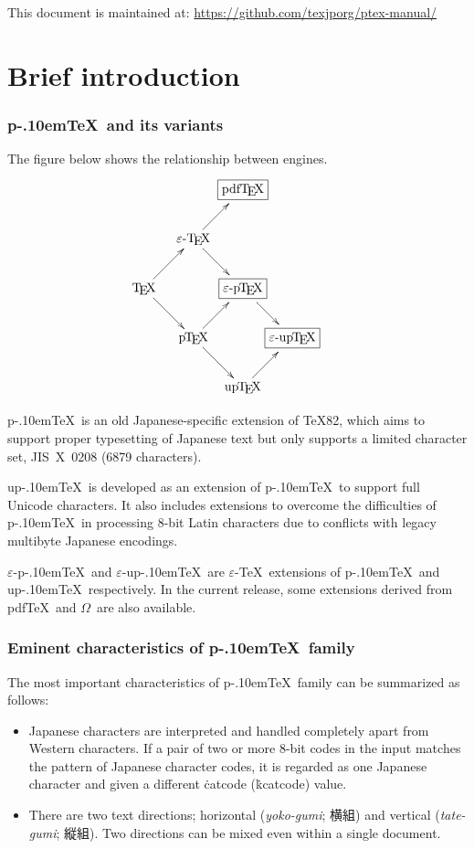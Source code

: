 \documentclass[a4paper,11pt,dvipdfmx]{article}
\def\Foreign#1{\textit{#1}}
\def\eTeXpre{$\varepsilon$-}
\def\eTeX{\leavevmode\hbox{\eTeXpre\TeX}}
\def\epTeX{\leavevmode\hbox{\eTeXpre\pTeX}}
\def\eupTeX{\leavevmode\hbox{\eTeXpre\upTeX}}
\def\pTeX{p\kern-.10em\TeX}\def\upTeX{u\pTeX}
\def\pdfTeX{pdf\TeX}
\def\OMEGA{$\Omega$}
\begin{document}
This document is maintained at:
\url{https://github.com/texjporg/ptex-manual/}

\tableofcontents


\newpage


\part{Brief introduction}%

\section{\pTeX\ and its variants}

The figure below shows the relationship between engines.
\[
\xymatrix@ur{
 \text{\TeX}   \ar[r]\ar[d] & \text{\eTeX}  \ar[r]\ar[d]
   & \text{\fbox{\pdfTeX}} \\
 \text{\pTeX}  \ar[r]\ar[d] & \text{\fbox{\epTeX}} \ar[d] &\\
 \text{\upTeX} \ar[r]       & \text{\fbox{\eupTeX}}       &
}
\]

\pTeX\ is an old Japanese-specific extension of \TeX82,
which aims to support proper typesetting of Japanese text
but only supports a limited character set, JIS~X~0208 (6879 characters).

\upTeX\ is developed as an extension of \pTeX\ to support full Unicode
characters. It also includes extensions to overcome the difficulties of
\pTeX\ in processing 8-bit Latin characters due to conflicts with
legacy multibyte Japanese encodings.

\epTeX\ and \eupTeX\ are \eTeX\ extensions of \pTeX\ and \upTeX\ respectively.
In the current release, some extensions derived from \pdfTeX\ and \OMEGA\ are
also available.

\section{Eminent characteristics of \pTeX\ family}

The most important characteristics of \pTeX\ family can be
summarized as follows:
\begin{itemize}
  \item Japanese characters are interpreted and handled completely apart from
    Western characters. If a pair of two or more 8-bit codes in the input
    matches the pattern of Japanese character codes, it is regarded as one
    Japanese character and given a different \.{catcode} (\.{kcatcode}) value.
  \item There are two text directions; horizontal (\Foreign{yoko-gumi}; 横組)
    and vertical (\Foreign{tate-gumi}; 縦組).
    Two directions can be mixed even within a single document.
\end{itemize}
\end{document}

